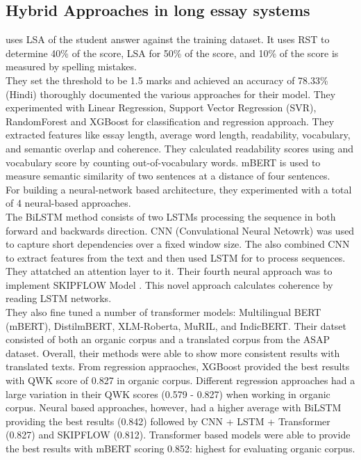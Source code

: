 \documentclass{article}
\begin{document}
\subsection{Hybrid Approaches in long essay systems}
\textbf{\textcite{5_aljouie2017schoolchildren}} uses LSA of the student answer against the training dataset. It uses RST to determine 40\% of the score, LSA for 50\% of the score, and 10\% of the score is measured by spelling mistakes. \\ They set the threshold to be 1.5 marks and achieved an accuracy of 78.33\% \\
\textbf{\textcite{10_singh2023hindi}} (Hindi) thoroughly documented the various approaches for their model. They experimented with Linear Regression, Support Vector Regression (SVR), RandomForest and XGBoost for classification and regression approach. They extracted features like essay length, average word length, readability, vocabulary, and semantic overlap and coherence. They calculated readability scores using \cite{sinha2012new} and vocabulary score by counting out-of-vocabulary words. mBERT is used to measure semantic similarity of two sentences at a distance of four sentences. \\ For building a neural-network based architecture,  they experimented with a total of 4 neural-based approaches. \\ The BiLSTM method consists of two LSTMs processing the sequence in both forward and backwards direction. CNN (Convulational Neural Netowrk) was used to capture short dependencies over a fixed window size. The also combined CNN to extract features from the text and then used LSTM for to process sequences. They attatched an attention layer to it. Their fourth neural approach was to implement SKIPFLOW Model \cite{tay2018skipflow}. This novel approach calculates coherence by reading LSTM networks. \\ They also fine tuned a number of transformer models: Multilingual BERT (mBERT), DistilmBERT, XLM-Roberta, MuRIL, and IndicBERT. Their datset consisted of both an organic corpus and a translated corpus from the ASAP dataset. Overall, their methods were able to show more consistent results with translated texts. From regression appraoches, XGBoost provided the best results with QWK score of 0.827 in organic corpus. Different regression approaches had a large variation in their QWK scores (0.579 - 0.827) when working in organic corpus. Neural based approaches, however, had a higher average with BiLSTM providing the best results (0.842) followed by CNN + LSTM + Transformer (0.827) and SKIPFLOW (0.812). Transformer based models were able to provide the best results with mBERT scoring 0.852: highest for evaluating organic corpus. \\
\end{document}
